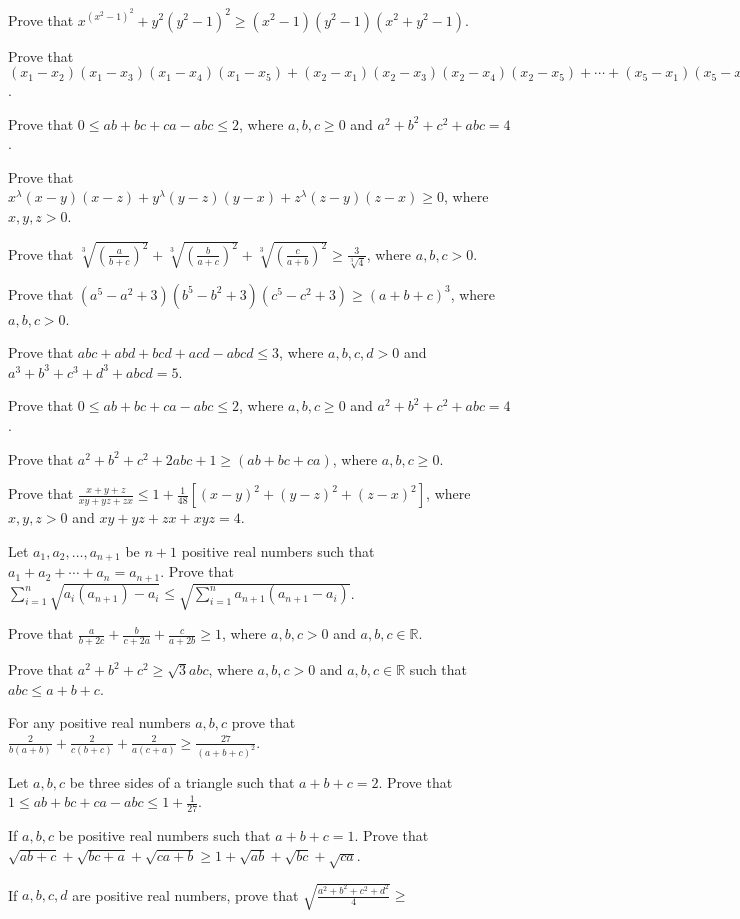 \item Prove that $x^(x^2 - 1)^2 + y^2(y^2 - 1)^2 \geq (x^2 - 1)(y^2 - 1)(x^2 + y^2 - 1)$.
\item Prove that $(x_1 - x_2)(x_1 - x_3)(x_1 - x_4)(x_1 - x_5) + (x_2 - x_1)(x_2 - x_3)(x_2 - x_4)(x_2 - x_5) + \cdots + (x_5 -
  x_1)(x_5 - x_2)(x_5 - x_3)(x_5 - x_4)\geq 0$.
\item Prove that $0\leq ab + bc + ca - abc\leq 2$, where $a, b, c\geq 0$ and $a^2 + b^2 + c^2 + abc = 4$.
\item Prove that $x^\lambda(x - y)(x - z) + y^\lambda(y - z)(y - x) + z^\lambda(z - y)(z - x)\geq 0$, where $x, y, z > 0$.
\item Prove that $\sqrt[3]{\left(\frac{a}{b + c}\right)^2} + \sqrt[3]{\left(\frac{b}{a + c}\right)^2} + \sqrt[3]{\left(\frac{c}{a +
    b}\right)^2}\geq \frac{3}{\sqrt[3]{4}}$, where $a, b, c > 0$.
\item Prove that $(a^5 - a^2 + 3)(b^5 - b^2 + 3)(c^5 - c^2 + 3)\geq (a + b + c)^3$, where $a, b, c > 0$.
\item Prove that $abc + abd + bcd + acd - abcd\leq 3$, where $a, b, c, d > 0$ and $a^3 + b^3 + c^3 + d^3 + abcd = 5$.
\item Prove that $0\leq ab + bc + ca - abc\leq 2$, where $a, b, c\geq 0$ and $a^2 + b^2 + c^2 + abc = 4$.
\item Prove that $a^2 + b^2 + c^2 + 2abc + 1\geq (ab + bc + ca)$, where $a, b, c\geq 0$.
\item Prove that $\frac{x + y + z}{xy + yz + zx}\leq 1 + \frac{1}{48}[(x - y)^2 + (y - z)^2 + (z - x)^2]$, where $x, y, z > 0$ and
  $xy + yz + zx + xyz = 4$.
\item Let $a_1, a_2, \ldots, a_{n +1}$ be $n + 1$ positive real numbers such that $a_1 + a_2 + \cdots + a_n = a_{n + 1}$. Prove
  that $\displaystyle\sum_{i=1}^n\sqrt{a_i(a_{n + 1}) - a_i} \leq \sqrt{\sum_{i = 1}^na_{n + 1}(a_{n + 1} - a_i)}$.
\item Prove that $\frac{a}{b + 2c} + \frac{b}{c + 2a} + \frac{c}{a + 2b}\geq 1$, where $a, b, c >0$ and $a, b, c\in\mathbb{R}$.
\item Prove that $a^2 + b^2 + c^2 \geq \sqrt{3}abc$, where $a, b, c >0$ and $a, b, c\in\mathbb{R}$ such that $abc\leq a + b + c$.
\item For any positive real numbers $a, b, c$ prove that $\frac{2}{b(a + b)} + \frac{2}{c(b + c)} + \frac{2}{a(c + a)}\geq
  \frac{27}{(a + b + c)^2}$.
\item Let $a, b, c$ be three sides of a triangle such that $a + b + c = 2$. Prove that $1\leq ab + bc + ca - abc\leq 1 +
  \frac{1}{27}$.
\item If $a, b, c$ be positive real numbers such that $a + b + c = 1$. Prove that $\sqrt{ab + c} + \sqrt{bc + a} + \sqrt{ca +
  b}\geq 1 + \sqrt{ab} + \sqrt{bc} + \sqrt{ca}$.
\item If $a, b, c, d$ are positive real numbers, prove that $\sqrt{\frac{a^2 + b^2 + c^2 + d^2}{4}}\geq$

